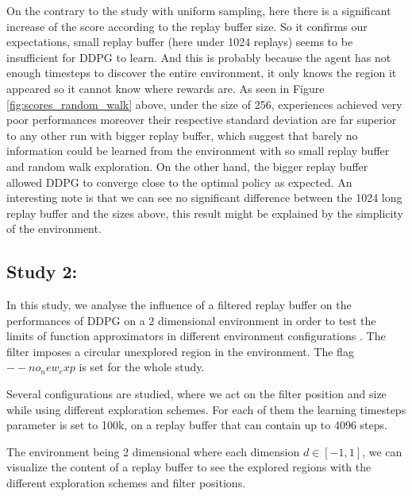\documentclass{article}
\begin{document}
On the contrary to the study with uniform sampling, here there is a significant increase of the score according to the replay buffer size. So it confirms our expectations, small replay buffer (here under 1024 replays) seems to be insufficient for DDPG to learn. And this is probably because the agent has not enough timesteps to discover the entire environment, it only knows the region it appeared so it cannot know where rewards are. As seen in Figure \ref{fig:scores_random_walk} above, under the size of 256, experiences achieved very poor performances moreover their respective standard deviation are far superior to any other run with bigger replay buffer, which suggest that barely no information could be learned from the environment with so small replay buffer and random walk exploration. On the other hand, the bigger replay buffer allowed DDPG to converge close to the optimal policy as expected. An interesting note is that we can see no significant difference between the 1024 long replay buffer and the sizes above, this result might be explained by the simplicity of the environment.


\subsection{Study 2:}

In this study, we analyse the influence of a filtered replay buffer on the performances of DDPG on a 2 dimensional environment in order to test the limits of function approximators  in different environment configurations \cite{schaul_universal_2015}. The filter imposes a circular unexplored region in the environment. The flag $--no_new_exp$ is set for the whole study.

Several configurations are studied, where we act on the filter position and size while using different exploration schemes. For each of them the learning timesteps parameter is set to 100k, on a replay buffer that can contain up to 4096 steps.

The environment being 2 dimensional where each dimension $d\in[-1,1]$, we can visualize the content of a replay buffer to see the explored regions with the different exploration schemes and filter positions.
\end{document}
